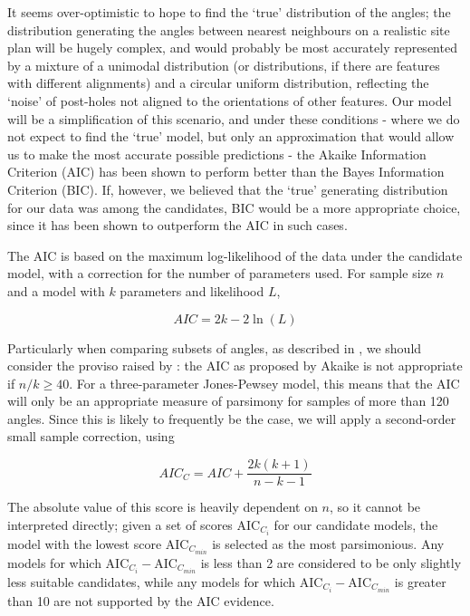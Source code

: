 \documentclass[../../ArchStats.tex]{subfiles}
\begin{document}
It seems over-optimistic to hope to find the `true' distribution of the angles; the distribution generating the angles between nearest neighbours on a realistic site plan will be hugely complex, and would probably be most accurately represented by a mixture of a unimodal distribution (or distributions, if there are features with different alignments) and a circular uniform distribution, reflecting the `noise'  of post-holes not aligned to the orientations of other features. Our model will be a simplification of this scenario, and under these conditions - where we do not expect to find the `true' model, but only an approximation that would allow us to make the most accurate possible predictions - the Akaike Information Criterion (AIC) has been shown to perform better than the Bayes Information Criterion (BIC)\cite{aho2014}. If, however, we believed that the `true' generating distribution for our data was among the candidates, BIC would be a more appropriate choice, since it has been shown to outperform the AIC in such cases. 

The AIC is based on the maximum log-likelihood of the data under the candidate model, with a correction for the number of parameters used\cite{Akaike1974}. For sample size $n$ and a model with $k$ parameters and likelihood $L$, 

\[AIC = 2k - 2 \ln (L)\]

Particularly when comparing subsets of angles, as described in , we should consider the proviso raised by \cite{Burnham2004}: the AIC as proposed by Akaike  is not appropriate if $n/k \geq 40$. For a three-parameter Jones-Pewsey model, this means that the AIC will only be an appropriate measure of parsimony for samples of more than 120 angles. Since this is likely to frequently be the case, we will apply a second-order small sample correction, using

\[AIC_C = AIC + \frac{2k(k+1)}{n-k-1} \]

The absolute value of this score is heavily dependent on $n$, so it cannot be interpreted directly; given a set of scores AIC$_{C_i}$ for our candidate models, the model with the lowest score AIC$_{C_{min}}$ is selected as the most parsimonious. Any models for which AIC$_{C_i} - $AIC$_{C_{min}}$ is less than 2 are considered to be only slightly less suitable candidates, while any models for which AIC$_{C_i} - $AIC$_{C_{min}}$ is greater than 10 are not supported by the AIC evidence.
\end{document}
